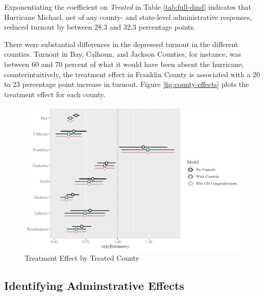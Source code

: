 \documentclass[
  12pt,
]{article}
\begin{document}
\begin{singlespace}


\end{singlespace}

Exponentiating the coefficient on \emph{Treated} in Table \ref{tab:full-dind} indicates that Hurricane Michael, net of any county- and state-level administrative responses, reduced turnout by between 28.3 and 32.3 percentage points.

There were substantial differences in the depressed turnout in the different counties. Turnout in Bay, Calhoun, and Jackson Counties, for instance, was between 60 and 70 percent of what it would have been absent the hurricane; counterintuitively, the treatment effect in Franklin County is associated with a 20 to 23 percentage point increase in turnout. Figure \ref{fig:county-effects} plots the treatment effect for each county.

\begin{figure}[H]

{\centering \includegraphics{hurricane_michael_files/figure-latex/county-effect-chunk-1} 

}

\caption{\label{fig:county-effects}Treatment Effect by Treated County}\label{fig:county-effect-chunk}
\end{figure}

\hypertarget{identifying-adminstrative-effects}{%
\subsection*{Identifying Adminstrative Effects}\label{identifying-adminstrative-effects}}
\end{document}
